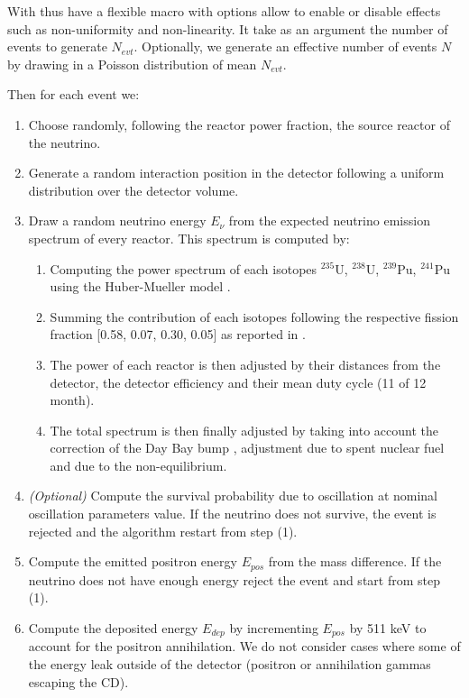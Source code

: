 \documentclass[../main.tex]{subfiles}
\begin{document}
With thus have a flexible macro with options allow to enable or disable effects such as non-uniformity and non-linearity. It take as an argument the number of events to generate $N_{evt}$. Optionally, we generate an effective number of events $N$ by drawing in a Poisson distribution of mean $N_{evt}$.

Then for each event we:
\begin{enumerate}
  \item Choose randomly, following the reactor power fraction, the source reactor of the neutrino.
  \item Generate a random interaction position in the detector following a uniform distribution over the detector volume.
  \item Draw a random neutrino energy $E_{\nu}$ from the expected neutrino emission spectrum of every reactor. This spectrum is computed by:
    \begin{enumerate}
      \item Computing the power spectrum of each isotopes $^{235}$U, $^{238}$U, $^{239}$Pu, $^{241}$Pu using the Huber-Mueller model \cite{huber_determination_2011, mueller_improved_2011}.
      \item Summing the contribution of each isotopes following the respective fission fraction [0.58, 0.07, 0.30, 0.05] as reported in \cite{ma_improved_2013}.
      \item The power of each reactor is then adjusted by their distances from the detector, the detector efficiency and their mean duty cycle (11 of 12 month).
      \item The total spectrum is then finally adjusted by taking into account the correction of the Day Bay bump \cite{daya_bay_collaboration_measurement_2016}, adjustment due to spent nuclear fuel and due to the non-equilibrium.
    \end{enumerate}
  \item \textit{(Optional)} Compute the survival probability due to oscillation at nominal oscillation parameters value. If the neutrino does not survive, the event is rejected and the algorithm restart from step (1).
  \item Compute the emitted positron energy $E_{pos}$ from the mass difference. If the neutrino does not have enough energy reject the event and start from step (1).
  \item Compute the deposited energy $E_{dep}$ by incrementing $E_{pos}$ by 511 keV to account for the positron annihilation. We do not consider cases where some of the energy leak outside of the detector (positron or annihilation gammas escaping the CD).

\end{enumerate}
\end{document}
